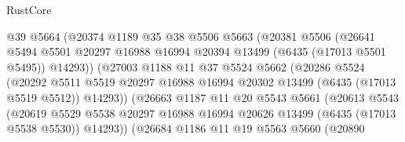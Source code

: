 \begin{lexlean}{RustCore}
\begin{coremodule}
                            @39
                            @5664
                            (@20374
                              @1189
                              @35
                              @38
                              @5506
                              @5663
                              (@20381
                                @5506
                                (@26641
                                  @5494
                                  @5501
                                  @20297
                                  @16988
                                  @16994
                                  @20394
                                  @13499
                                  (@6435 (@17013 @5501 @5495))
                                  @14293))
                              (@27003
                                @1188
                                @11
                                @37
                                @5524
                                @5662
                                (@20286
                                  @5524
                                  (@20292
                                    @5511
                                    @5519
                                    @20297
                                    @16988
                                    @16994
                                    @20302
                                    @13499
                                    (@6435 (@17013 @5519 @5512))
                                    @14293))
                                (@26663
                                  @1187
                                  @11
                                  @20
                                  @5543
                                  @5661
                                  (@20613
                                    @5543
                                    (@20619
                                      @5529
                                      @5538
                                      @20297
                                      @16988
                                      @16994
                                      @20626
                                      @13499
                                      (@6435 (@17013 @5538 @5530))
                                      @14293))
                                  (@26684
                                    @1186
                                    @11
                                    @19
                                    @5563
                                    @5660
                                    (@20890

\end{coremodule}
\end{lexlean}
